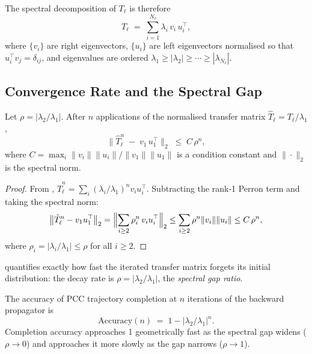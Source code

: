 The spectral decomposition of $T_\ell$ is therefore
\begin{equation}
\label{eq:ch05-spectral-decomp}
    T_\ell \;=\; \sum_{i=1}^{N_\ell} \lambda_i\, v_i\, u_i^\top,
\end{equation}
where $\{v_i\}$ are right eigenvectors, $\{u_i\}$ are left eigenvectors
normalised so that $u_i^\top v_j = \delta_{ij}$, and eigenvalues are
ordered $\lambda_1 \geq |\lambda_2| \geq \cdots \geq |\lambda_{N_\ell}|$.

\subsection{Convergence Rate and the Spectral Gap}

\begin{theorem}
\label{thm:ch05-spectral-convergence}
Let $\rho = |\lambda_2 / \lambda_1|$.  After $n$ applications of the
normalised transfer matrix $\hat{T}_\ell = T_\ell / \lambda_1$,
\begin{equation}
\label{eq:ch05-convergence}
    \bigl\|\hat{T}_\ell^n \;-\; v_1\, u_1^\top\bigr\|_2
    \;\leq\; C\,\rho^n,
\end{equation}
where $C = \max_i \|v_i\|\|u_i\| / \|v_1\|\|u_1\|$ is a condition
constant and $\|\cdot\|_2$ is the spectral norm.
\end{theorem}

\begin{proof}
From ,
$\hat{T}_\ell^n = \sum_i (\lambda_i/\lambda_1)^n v_i u_i^\top$.
Subtracting the rank-1 Perron term and taking the spectral norm:
\[
    \bigl\|\hat{T}_\ell^n - v_1 u_1^\top\bigr\|_2
    = \Bigl\|\sum_{i \geq 2} \rho_i^n\, v_i u_i^\top \Bigr\|_2
    \leq \sum_{i \geq 2} \rho^n \|v_i\|\|u_i\|
    \leq C\, \rho^n,
\]
where $\rho_i = |\lambda_i/\lambda_1| \leq \rho$ for all $i \geq 2$.
\end{proof}

 quantifies exactly how fast the
iterated transfer matrix forgets its initial distribution: the decay rate
is $\rho = |\lambda_2/\lambda_1|$, the \emph{spectral gap ratio}.

\begin{corollary}
\label{cor:ch05-accuracy}
The accuracy of PCC trajectory completion at $n$ iterations of the backward
propagator is
\begin{equation}
\label{eq:ch05-accuracy}
    \mathrm{Accuracy}(n) \;=\; 1 - |\lambda_2/\lambda_1|^n.
\end{equation}
Completion accuracy approaches 1 geometrically fast as the spectral gap
widens ($\rho \to 0$) and approaches it more slowly as the gap narrows
($\rho \to 1$).
\end{corollary}

